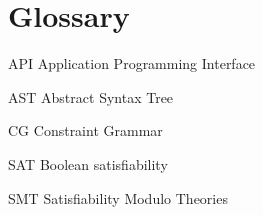 
\chapter{Glossary}\label{app:glossary}



\begin{compactdesc}
\item[API] Application Programming Interface
\item[AST] Abstract Syntax Tree
\item[CG] Constraint Grammar \cite{karlsson1995constraint}
\item[SAT] Boolean satisfiability
\item[SMT] Satisfiability Modulo Theories
\end{compactdesc}
